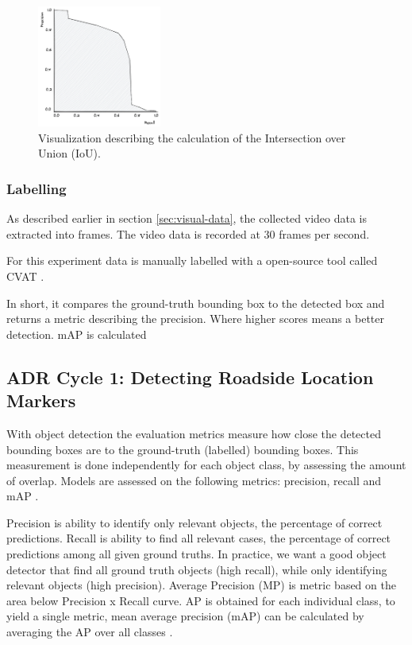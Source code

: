 \begin{figure}[ht]
\begin{center}
\includegraphics[height=4cm]{images/5_multimodal_fusion/precision-recall.png}
\end{center}
\captionsetup{width=0.95\textwidth}
\caption{Visualization describing the calculation of the Intersection over Union (IoU).}
\label{fig:precision-recall-curve}
\end{figure}


\subsubsection{Labelling}

As described earlier in section \ref{sec:visual-data}, the collected video data is extracted into frames. The video data is recorded at 30 frames per second. 

For this experiment data is manually labelled with a open-source tool called CVAT \cite{cvat}. 



In short, it compares the ground-truth bounding box to the detected box and returns a metric describing the precision. Where higher scores means a better detection. mAP is calculated 





\subsection{ADR Cycle 1: Detecting Roadside Location Markers}

With object detection the evaluation metrics measure how close the detected bounding boxes are to the ground-truth (labelled) bounding boxes. This measurement is done independently for each object class, by assessing the amount of overlap. Models are assessed on the following metrics: precision, recall and mAP \cite{Padilla2021}.

Precision is ability to identify only relevant objects, the percentage of correct predictions. Recall is ability to find all relevant cases, the percentage of correct predictions among all given ground truths. In practice, we want a good object detector that find all ground truth objects (high recall), while only identifying relevant objects (high precision). Average Precision (MP) is metric based on the area below Precision x Recall curve. AP is obtained for each individual class, to yield a single metric, mean average precision (mAP) can be calculated by averaging the AP over all classes \cite{Padilla2021}.

